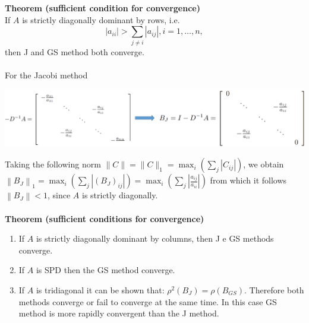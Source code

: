 \documentclass[11pt]{book}
\begin{document}
\textbf{Theorem (sufficient condition for convergence)}\\
If $A$ is strictly diagonally dominant by rows, i.e.
$$
\left|a_{i i}\right|>\sum_{j \neq i}\left|a_{i j}\right|, i=1, \ldots, n,
$$
then J and GS method both converge.\\ \\
For the Jacobi method
\begin{center}
\includegraphics[scale=0.4]{images/Matrix1.png}
\end{center}
Taking the  following norm $\|C\|=\|C\|_{1}=\max _{i}\left(\sum_{j}\left|C_{i j}\right|\right)$, we obtain $\left\|B_{J}\right\|_{1}=\max _{i}\left(\sum_{j}\left|\left(B_{J}\right)_{i j}\right|\right)=\max _{i}\left(\sum_{j}\left|\frac{a_{i j}}{a_{i i}}\right|\right)$ from which it follows $\left\|B_{J}\right\|<1$, since $A$ is strictly diagonally.\\
\\
\textbf{Theorem (sufficient conditions for convergence)}
\begin{enumerate}
  \item If $A$ is strictly diagonally dominant by columns, then J e GS methods converge.\\
  \item If $A$ is SPD then the GS method converge.\\
  \item If $A$ is tridiagonal it can be shown that: $\rho^{2}\left(B_{J}\right)=\rho\left(B_{G S}\right)$. Therefore both methods converge or fail to converge at the same time. In this case GS method is more rapidly convergent than the J method.\\
\end{enumerate}
\end{document}
